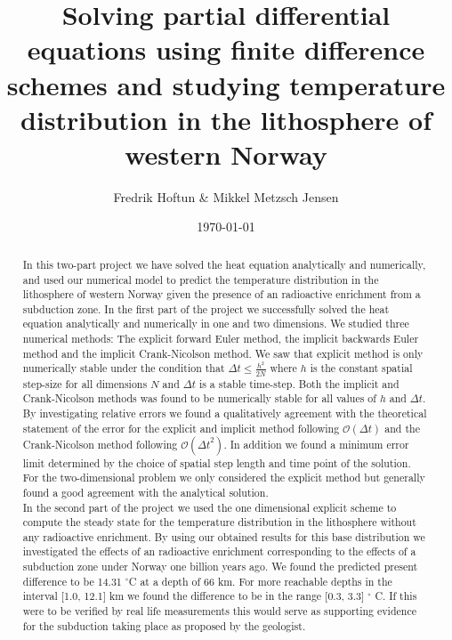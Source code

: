 \documentclass[%
 reprint,
nofootinbib,
aps,
]{revtex4-1}
\begin{document}
\title{Solving partial differential equations using finite difference schemes and studying temperature distribution in the lithosphere of western Norway}
\author{Fredrik Hoftun \& Mikkel Metzsch Jensen}

\date{\today}



\begin{abstract}
In this two-part project we have solved the heat equation analytically and numerically, and used our numerical model to predict the temperature distribution in the lithosphere of western Norway given the presence of an radioactive enrichment from a subduction zone. In the first part of the project we successfully solved the heat equation analytically and numerically in one and two dimensions. We studied three numerical methods: The explicit forward Euler method, the implicit backwards Euler method and the implicit Crank-Nicolson method. We saw that explicit method is only numerically stable under the condition that $\Delta t \leq \frac{h^2}{2N}$ where $h$ is the constant spatial step-size for all dimensions $N$ and $\Delta t$ is a stable time-step. Both the implicit and Crank-Nicolson methods was found to be numerically stable for all values of $h$ and $\Delta t$. By investigating relative errors we found a qualitatively agreement with the theoretical statement of the error for the explicit and implicit method following $\mathcal{O}(\Delta t)$ and the Crank-Nicolson method following $\mathcal{O}(\Delta t^2)$. In addition we found a minimum error limit determined by the choice of spatial step length and time point of the solution. For the two-dimensional problem we only considered the explicit method but generally found a good agreement with the analytical solution.
\\
In the second part of the project we used the one dimensional explicit scheme to compute the steady state for the temperature distribution in the lithosphere without any radioactive enrichment. By using our obtained results for this base distribution we investigated the effects of an radioactive enrichment corresponding to the effects of a subduction zone under Norway one billion years ago. We found the predicted present difference to be 14.31 $^{\circ}$C at a depth of 66 km. For more reachable depths in the interval [1.0, 12.1] km we found the difference to be in the range [0.3, 3.3] $^{\circ}$ C. If this were to be verified by real life measurements this would serve as supporting evidence for the subduction taking place as proposed by the geologist.



\end{abstract}
\end{document}
